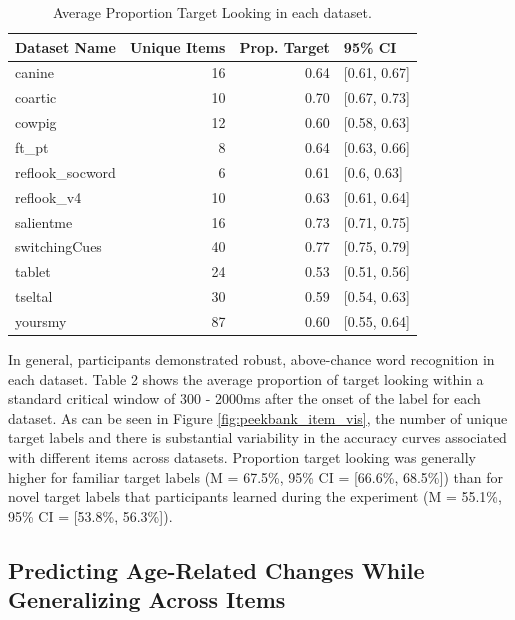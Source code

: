\documentclass[10pt, letterpaper]{article}
\begin{document}
\begin{table}[H]
\centering
\begingroup\fontsize{9pt}{10pt}\selectfont
\begin{tabular}{lrrl}
  \hline
Dataset Name & Unique Items & Prop. Target & 95\% CI \\ 
  \hline
canine & 16 & 0.64 & [0.61, 0.67] \\ 
  coartic & 10 & 0.70 & [0.67, 0.73] \\ 
  cowpig & 12 & 0.60 & [0.58, 0.63] \\ 
  ft\_pt & 8 & 0.64 & [0.63, 0.66] \\ 
  reflook\_socword & 6 & 0.61 & [0.6, 0.63] \\ 
  reflook\_v4 & 10 & 0.63 & [0.61, 0.64] \\ 
  salientme & 16 & 0.73 & [0.71, 0.75] \\ 
  switchingCues & 40 & 0.77 & [0.75, 0.79] \\ 
  tablet & 24 & 0.53 & [0.51, 0.56] \\ 
  tseltal & 30 & 0.59 & [0.54, 0.63] \\ 
  yoursmy & 87 & 0.60 & [0.55, 0.64] \\ 
   \hline
\end{tabular}
\endgroup
\caption{Average Proportion Target Looking in each dataset.} 
\end{table}

In general, participants demonstrated robust, above-chance word
recognition in each dataset. Table 2 shows the average proportion of
target looking within a standard critical window of 300 - 2000ms after
the onset of the label for each dataset. As can be seen in Figure
\ref{fig:peekbank_item_vis}, the number of unique target labels and
there is substantial variability in the accuracy curves associated with
different items across datasets. Proportion target looking was generally
higher for familiar target labels (M = 67.5\%, 95\% CI = {[}66.6\%,
68.5\%{]}) than for novel target labels that participants learned during
the experiment (M = 55.1\%, 95\% CI = {[}53.8\%, 56.3\%{]}).

\hypertarget{predicting-age-related-changes-while-generalizing-across-items}{%
\subsection{Predicting Age-Related Changes While Generalizing Across
Items}\label{predicting-age-related-changes-while-generalizing-across-items}}
\end{document}
